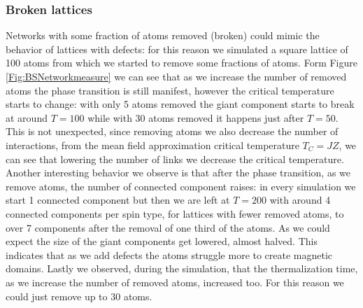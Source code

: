 \subsubsection*{Broken lattices}
Networks with some fraction of atoms removed (broken) could mimic the behavior of lattices with defects: for this reason we simulated a square lattice of 100 atoms from which we started to remove some fractions of atoms. Form Figure \ref{Fig:BSNetworkmeasure} we can see that as we increase the number of removed atoms the phase transition is still manifest, however the critical temperature starts to change: with only 5 atoms removed the giant component starts to break at around $T=100$ while with 30 atoms removed it happens just after $T=50$. This is not unexpected, since removing atoms we also decrease the number of interactions, from the mean field approximation critical temperature $T_C=JZ$, we can see that lowering the number of links we decrease the critical temperature. Another interesting behavior we observe is that after the phase transition, as we remove atoms, the number of connected component raises: in every simulation we start 1 connected component but then we are left at $T=200$ with around 4 connected components per spin type, for lattices with fewer removed atoms, to over 7 components after the removal of one third of the atoms. As we could expect the size of the giant components get lowered, almost halved. This indicates that as we add defects the atoms struggle more to create magnetic domains. Lastly we observed, during the simulation, that the thermalization time, as we increase the number of removed atoms, increased too. For this reason we could just remove up to 30 atoms.
\begin{figure}[!htb]
\end{figure}
